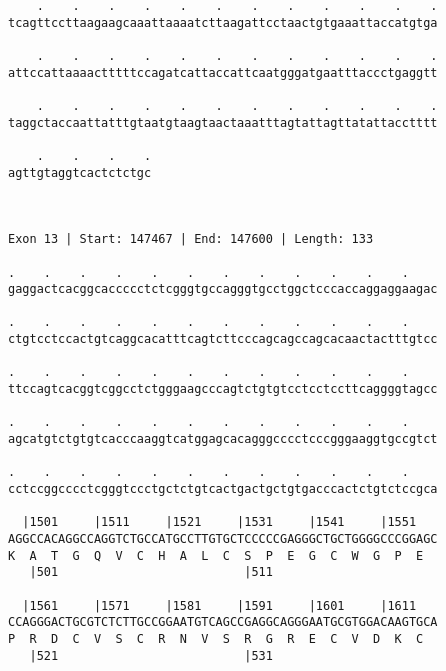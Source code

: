 \documentclass{article}
\begin{document}
\begin{Verbatim}
    .    .    .    .    .    .    .    .    .    .    .    .
tcagttccttaagaagcaaattaaaatcttaagattcctaactgtgaaattaccatgtga
                                                            
    .    .    .    .    .    .    .    .    .    .    .    .
attccattaaaactttttccagatcattaccattcaatgggatgaatttaccctgaggtt
                                                            
    .    .    .    .    .    .    .    .    .    .    .    .
taggctaccaattatttgtaatgtaagtaactaaatttagtattagttatattacctttt
                                                            
    .    .    .    .
agttgtaggtcactctctgc
                    
                    
 
Exon 13 | Start: 147467 | End: 147600 | Length: 133
 
.    .    .    .    .    .    .    .    .    .    .    .    
gaggactcacggcaccccctctcgggtgccagggtgcctggctcccaccaggaggaagac
                                                            
.    .    .    .    .    .    .    .    .    .    .    .    
ctgtcctccactgtcaggcacatttcagtcttcccagcagccagcacaactactttgtcc
                                                            
.    .    .    .    .    .    .    .    .    .    .    .    
ttccagtcacggtcggcctctgggaagcccagtctgtgtcctcctccttcaggggtagcc
                                                            
.    .    .    .    .    .    .    .    .    .    .    .    
agcatgtctgtgtcacccaaggtcatggagcacagggcccctcccgggaaggtgccgtct
                                                            
.    .    .    .    .    .    .    .    .    .    .    .    
cctccggcccctcgggtccctgctctgtcactgactgctgtgacccactctgtctccgca
                                                            
  |1501     |1511     |1521     |1531     |1541     |1551   
AGGCCACAGGCCAGGTCTGCCATGCCTTGTGCTCCCCCGAGGGCTGCTGGGGCCCGGAGC
K  A  T  G  Q  V  C  H  A  L  C  S  P  E  G  C  W  G  P  E  
   |501                          |511                       
  
  |1561     |1571     |1581     |1591     |1601     |1611   
CCAGGGACTGCGTCTCTTGCCGGAATGTCAGCCGAGGCAGGGAATGCGTGGACAAGTGCA
P  R  D  C  V  S  C  R  N  V  S  R  G  R  E  C  V  D  K  C  
   |521                          |531                       
  

\end{Verbatim}
\end{document}
